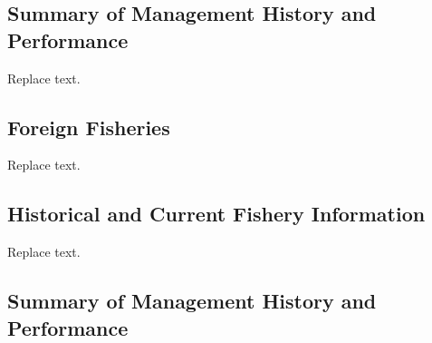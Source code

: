 \documentclass[11pt,
  english,
  a4paper,
]{article}
\begin{document}

\hypertarget{summary-of-management-history-and-performance}{%
\subsection{Summary of Management History and Performance}\label{summary-of-management-history-and-performance}}

\leavevmode\tagmcend\tagstructend


Replace text.

\leavevmode\tagmcend\tagstructend\par


\hypertarget{foreign-fisheries}{%
\subsection{Foreign Fisheries}\label{foreign-fisheries}}

\leavevmode\tagmcend\tagstructend


Replace text.

\leavevmode\tagmcend\tagstructend\par


\hypertarget{historical-and-current-fishery-information-1}{%
\subsection{Historical and Current Fishery Information}\label{historical-and-current-fishery-information-1}}

\leavevmode\tagmcend\tagstructend


Replace text.

\leavevmode\tagmcend\tagstructend\par


\hypertarget{summary-of-management-history-and-performance-1}{%
\subsection{Summary of Management History and Performance}\label{summary-of-management-history-and-performance-1}}
\end{document}
